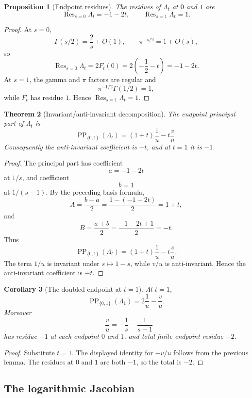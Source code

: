 \documentclass[11pt]{amsart}
\newtheorem{theorem}{Theorem}[section]
\newtheorem{proposition}[theorem]{Proposition}
\newtheorem{corollary}[theorem]{Corollary}
\DeclareMathOperator{\Res}{Res}
\begin{document}
\begin{proposition}[Endpoint residues]
The residues of $\Lambda_t$ at $0$ and $1$ are
\[
       \Res_{s=0}\Lambda_t=-1-2t,
       \qquad
       \Res_{s=1}\Lambda_t=1.
\]
\end{proposition}

\begin{proof}
At $s=0$,
\[
      \Gamma(s/2)=\frac{2}{s}+O(1),
      \qquad
      \pi^{-s/2}=1+O(s),
\]
so
\[
      \Res_{s=0}\Lambda_t=2F_t(0)=2\left(-\frac12-t\right)=-1-2t.
\]
At $s=1$, the gamma and $\pi$ factors are regular and
\[
      \pi^{-1/2}\Gamma(1/2)=1,
\]
while $F_t$ has residue $1$.  Hence $\Res_{s=1}\Lambda_t=1$.\end{proof}

\begin{theorem}[Invariant/anti-invariant decomposition]
The endpoint principal part of $\Lambda_t$ is
\[
       \operatorname{PP}_{\{0,1\}}(\Lambda_t)
       =(1+t)\frac1u-t\frac vu.
\]
Consequently the anti-invariant coefficient is $-t$, and at $t=1$ it is $-1$.
\end{theorem}

\begin{proof}
The principal part has coefficient
\[
      a=-1-2t
\]
at $1/s$, and coefficient
\[
      b=1
\]
at $1/(s-1)$.  By the preceding basis formula,
\[
      A=\frac{b-a}{2}=\frac{1-(-1-2t)}2=1+t,
\]
and
\[
      B=\frac{a+b}{2}=\frac{-1-2t+1}{2}=-t.
\]
Thus
\[
      \operatorname{PP}_{\{0,1\}}(\Lambda_t)
      =(1+t)\frac1u-t\frac vu.
\]
The term $1/u$ is invariant under $s\mapsto1-s$, while $v/u$ is anti-invariant.  Hence the anti-invariant coefficient is $-t$.\end{proof}

\begin{corollary}[The doubled endpoint at $t=1$]
At $t=1$,
\[
      \operatorname{PP}_{\{0,1\}}(\Lambda_1)
      =2\frac1u-\frac vu.
\]
Moreover
\[
      -\frac vu=-\frac1s-\frac1{s-1}
\]
has residue $-1$ at each endpoint $0$ and $1$, and total finite endpoint residue $-2$.
\end{corollary}

\begin{proof}
Substitute $t=1$.  The displayed identity for $-v/u$ follows from the previous lemma.  The residues at $0$ and $1$ are both $-1$, so the total is $-2$.\end{proof}

\subsection{The logarithmic Jacobian}
\end{document}
